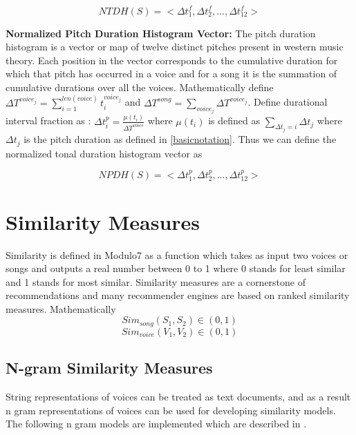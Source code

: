 \begin{equation} \label{eq:ntdh}
NTDH(S) = <\Delta t^f_1, \Delta t^f_2, ... , \Delta t^f_{12}>
\end{equation}

\noindent \textbf{Normalized Pitch Duration Histogram Vector:}  The pitch duration histogram is a vector or map of twelve distinct pitches present in western music theory. Each position in the vector corresponds to the cumulative duration for which that pitch has occurred in a voice and for a song it is the summation of cumulative durations over all the voices. Mathematically define $\Delta T^{voice_j} = \sum_{i=1}^{len(voice)} t_i^{voice_j}$ and $\Delta T^{song} = \sum_{voice_j} \Delta T^{voice_j}$. Define durational interval fraction as : $\Delta t^p_i = \frac{\mu (t_i)}{\Delta T^{voice}}$ where $\mu (t_i)$ is defined as $\sum_{\Delta t_j = i} \Delta t_j $ where $\Delta t_j$ is the pitch duration as defined in \ref{basicnotation}. Thus we can define the normalized tonal duration histogram vector as 

\begin{equation} \label{eq:npdh}
NPDH(S) = <\Delta t^p_1, \Delta t^p_2, ... , \Delta t^p_{12}>
\end{equation}


\section{Similarity Measures} \label{similarity}

\noindent Similarity is defined in Modulo7 as a function which takes as input two voices or songs and outputs a real number between 0 to 1 where 0 stands for least similar and 1 stands for most similar. Similarity measures are a cornerstone of recommendations and many recommender engines are based on ranked similarity measures. Mathematically
\begin{equation}
Sim_{song}(S_1, S_2) \in (0, 1)
\end{equation}
\begin{equation}
Sim_{voice}(V_1, V_2) \in (0, 1)
\end{equation}

\subsection{N-gram Similarity Measures} \label{ngramsim}

\noindent String representations of voices can be treated as text documents, and as a result n gram representations of voices can be used for developing similarity models. The following n gram models are implemented which are described in \cite{similietechnicalmanual}. \\

